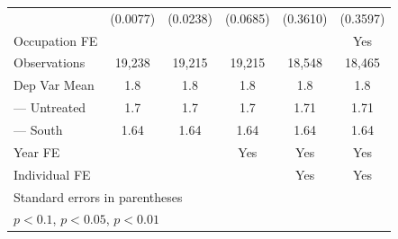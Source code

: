{\begin{tabular}{l*{5}{c}}
                    &    (0.0077)         &    (0.0238)         &    (0.0685)         &    (0.3610)         &    (0.3597)         \\
[1em]
Occupation FE       &                     &                     &                     &                     &         Yes         \\
\hline
Observations        &      19,238         &      19,215         &      19,215         &      18,548         &      18,465         \\
Dep Var Mean        &         1.8         &         1.8         &         1.8         &         1.8         &         1.8         \\
\qquad --- Untreated&         1.7         &         1.7         &         1.7         &        1.71         &        1.71         \\
\qquad --- South    &        1.64         &        1.64         &        1.64         &        1.64         &        1.64         \\
Year FE             &                     &                     &         Yes         &         Yes         &         Yes         \\
Individual FE       &                     &                     &                     &         Yes         &         Yes         \\
\hline\hline
\multicolumn{6}{l}{\footnotesize Standard errors in parentheses}\\
\multicolumn{6}{l}{\footnotesize \sym{*} \(p<0.1\), \sym{**} \(p<0.05\), \sym{***} \(p<0.01\)}\\
\end{tabular}
}
